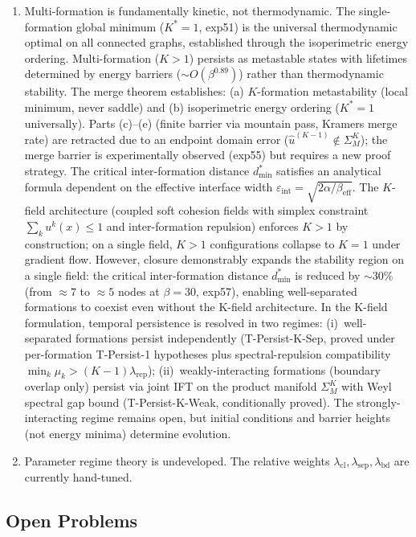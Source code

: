 \documentclass[lettersize,journal]{IEEEtran}
\begin{document}
\begin{enumerate}
\item Multi-formation is fundamentally kinetic, not thermodynamic. The single-formation global minimum ($K^* = 1$, exp51) is the universal thermodynamic optimal on all connected graphs, established through the isoperimetric energy ordering. Multi-formation ($K > 1$) persists as metastable states with lifetimes determined by energy barriers ($\sim O(\beta^{0.89})$) rather than thermodynamic stability. The merge theorem establishes: (a) $K$-formation metastability (local minimum, never saddle) and (b) isoperimetric energy ordering ($K^* = 1$ universally). Parts (c)--(e) (finite barrier via mountain pass, Kramers merge rate) are retracted due to an endpoint domain error ($\hat{u}^{(K-1)} \notin \Sigma^K_M$); the merge barrier is experimentally observed (exp55) but requires a new proof strategy. The critical inter-formation distance $d_{\min}^*$ satisfies an analytical formula dependent on the effective interface width $\varepsilon_{\mathrm{int}} = \sqrt{2\alpha/\beta_{\mathrm{eff}}}$. The $K$-field architecture (coupled soft cohesion fields with simplex constraint $\sum_k u^k(x) \leq 1$ and inter-formation repulsion) enforces $K > 1$ by construction; on a single field, $K > 1$ configurations collapse to $K=1$ under gradient flow. However, closure demonstrably expands the stability region on a single field: the critical inter-formation distance $d_{\min}^*$ is reduced by $\sim 30\%$ (from $\approx 7$ to $\approx 5$ nodes at $\beta = 30$, exp57), enabling well-separated formations to coexist even without the K-field architecture. In the K-field formulation, temporal persistence is resolved in two regimes: (i)~well-separated formations persist independently (T-Persist-K-Sep, proved under per-formation T-Persist-1 hypotheses plus spectral-repulsion compatibility $\min_k \mu_k > (K{-}1)\lambda_{\mathrm{rep}}$); (ii)~weakly-interacting formations (boundary overlap only) persist via joint IFT on the product manifold $\Sigma^K_M$ with Weyl spectral gap bound (T-Persist-K-Weak, conditionally proved). The strongly-interacting regime remains open, but initial conditions and barrier heights (not energy minima) determine evolution.

\item Parameter regime theory is undeveloped. The relative weights $\lambda_{\mathrm{cl}}, \lambda_{\mathrm{sep}}, \lambda_{\mathrm{bd}}$ are currently hand-tuned.
\end{enumerate}

\subsection{Open Problems}
\end{document}
